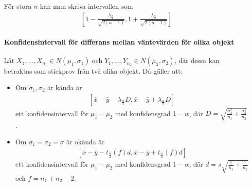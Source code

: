 För stora $n$ kan man skriva intervallen som
\begin{align*}
	\left[1 - \frac{\lambda_{\frac{\alpha}{2}}}{\sqrt{2(n - 1)}}, 1 + \frac{\lambda_{\frac{\alpha}{2}}}{\sqrt{2(n - 1)}}\right]
\end{align*}

\proof

\paragraph{Konfidensintervall för differans mellan väntevärden för olika objekt}
Låt $X_1, \dots, X_{n_1}\in N(\mu_1, \sigma_1)$ och $Y_1, \dots, Y_{n_2}\in N(\mu_2, \sigma_2)$, där dessa kan betraktas som stickprov från två olika objekt. Då gäller att:
\begin{itemize}
	\item Om $\sigma_1, \sigma_2$ är kända är
	\begin{align*}
		\left[\bar{x} - \bar{y} - \lambda_{\frac{\alpha}{2}}D, \bar{x} - \bar{y} + \lambda_{\frac{\alpha}{2}}D\right]
	\end{align*}
	ett konfidensintervall för $\mu_1 - \mu_2$ med konfidensgrad $1 - \alpha$, där $D = \sqrt{\frac{\sigma_1^2}{n_1} + \frac{\sigma_2^2}{n_2}}$.
	
	\item Om $\sigma_1 = \sigma_2 = \sigma$ är okända är
	\begin{align*}
		\left[\bar{x} - \bar{y} - t_{\frac{\alpha}{2}}(f)d, \bar{x} - \bar{y} + t_{\frac{\alpha}{2}}(f)d\right]
	\end{align*}
	ett konfidensintervall för $\mu_1 - \mu_2$ med konfidensgrad $1 - \alpha$, där $d = s\sqrt{\frac{1}{n_1} + \frac{1}{n_2}}$ och $f = n_1 + n_2 - 2$.
\end{itemize}

\proof

